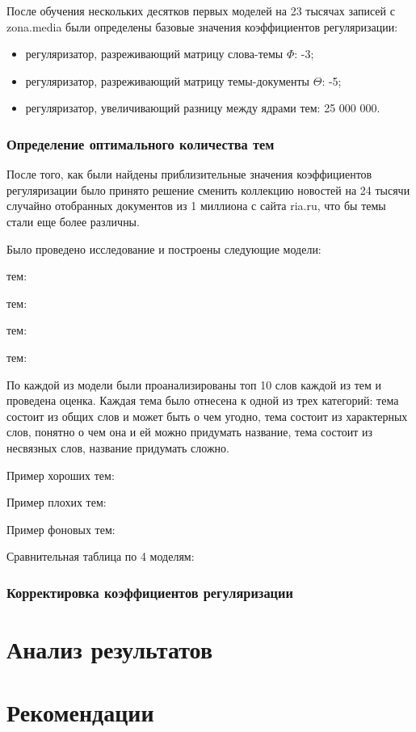 После обучения нескольких десятков первых моделей на 23 тысячах записей с zona.media были определены базовые значения коэффициентов регуляризации:

\begin{itemize}
    \item регуляризатор, разреживающий матрицу слова-темы $\Phi$: -3;
    \item регуляризатор, разреживающий матрицу темы-документы $\Theta$: -5;
    \item регуляризатор, увеличивающий разницу между ядрами тем: 25 000 000.
\end{itemize}



\subsubsection{Определение оптимального количества тем}

После того, как были найдены приблизительные значения коэффициентов регуляризации было принято решение сменить коллекцию новостей на 24 тысячи случайно отобранных документов из 1 миллиона с сайта ria.ru, что бы темы стали еще более различны.

Было проведено исследование и построены следующие модели:

 тем:

 тем:

 тем:

 тем:

По каждой из модели были проанализированы топ 10 слов каждой из тем и проведена оценка. Каждая тема было отнесена к одной из трех категорий: тема состоит из общих слов и может быть о чем угодно, тема состоит из характерных слов, понятно о чем она и ей можно придумать название, тема состоит из несвязных слов, название придумать сложно.

Пример хороших тем:

Пример плохих тем:

Пример фоновых тем:

Сравнительная таблица по 4 моделям:

\subsubsection{Корректировка коэффициентов регуляризации}


%
\section{Анализ результатов}

\todo[inline]{}

%
\section{Рекомендации}
